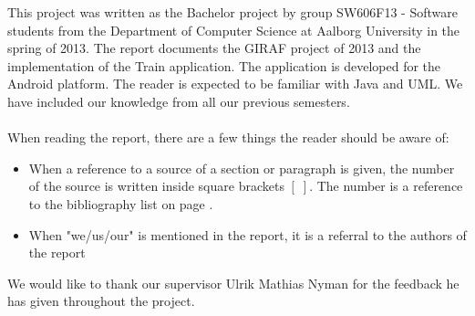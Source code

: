 This project was written as the Bachelor project by group SW606F13 - Software students from the Department of Computer Science at Aalborg University in the spring of 2013. The report documents the GIRAF project of 2013 and the implementation of the Train application. The application is developed for the Android platform. The reader is expected to be familiar with Java and UML. We have included our knowledge from all our previous semesters.
\\\\
When reading the report, there are a few things the reader should be aware of:
\begin{itemize}
\item When a reference to a source of a section or paragraph is given, the number of the source is written inside square brackets $[\;]$. The number is a reference to the bibliography list on page \pageref{chap:bib}.
\item When "we/us/our" is mentioned in the report, it is a referral to the authors of the report
\end{itemize}
We would like to thank our supervisor Ulrik Mathias Nyman for the feedback he has given throughout the project.

